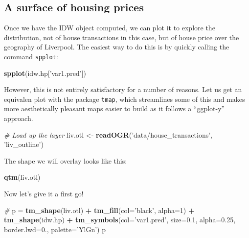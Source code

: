 \documentclass[
]{book}
\newenvironment{Shaded}{\begin{snugshade}}{\end{snugshade}}
\newcommand{\CommentTok}[1]{\textcolor[rgb]{0.56,0.35,0.01}{\textit{#1}}}
\newcommand{\DataTypeTok}[1]{\textcolor[rgb]{0.13,0.29,0.53}{#1}}
\newcommand{\DecValTok}[1]{\textcolor[rgb]{0.00,0.00,0.81}{#1}}
\newcommand{\FloatTok}[1]{\textcolor[rgb]{0.00,0.00,0.81}{#1}}
\newcommand{\KeywordTok}[1]{\textcolor[rgb]{0.13,0.29,0.53}{\textbf{#1}}}
\newcommand{\NormalTok}[1]{#1}
\newcommand{\OperatorTok}[1]{\textcolor[rgb]{0.81,0.36,0.00}{\textbf{#1}}}
\newcommand{\StringTok}[1]{\textcolor[rgb]{0.31,0.60,0.02}{#1}}
\begin{document}
\hypertarget{a-surface-of-housing-prices}{%
\subsection{A surface of housing prices}\label{a-surface-of-housing-prices}}

Once we have the IDW object computed, we can plot it to explore the distribution, not of house transactions in this case, but of house price over the geography of Liverpool. The easiest way to do this is by quickly calling the command \texttt{spplot}:

\begin{Shaded}
\begin{Highlighting}[]
\KeywordTok{spplot}\NormalTok{(idw.hp[}\StringTok{'var1.pred'}\NormalTok{])}
\end{Highlighting}
\end{Shaded}

However, this is not entirely satisfactory for a number of reasons. Let us get an equivalen plot with the package \texttt{tmap}, which streamlines some of this and makes more aesthetically pleasant maps easier to build as it follows a ``ggplot-y'' approach.

\begin{Shaded}
\begin{Highlighting}[]
\CommentTok{# Load up the layer}
\NormalTok{liv.otl <-}\StringTok{ }\KeywordTok{readOGR}\NormalTok{(}\StringTok{'data/house_transactions'}\NormalTok{, }\StringTok{'liv_outline'}\NormalTok{)}
\end{Highlighting}
\end{Shaded}

The shape we will overlay looks like this:

\begin{Shaded}
\begin{Highlighting}[]
\KeywordTok{qtm}\NormalTok{(liv.otl)}
\end{Highlighting}
\end{Shaded}

Now let's give it a first go!

\begin{Shaded}
\begin{Highlighting}[]
\CommentTok{# }
\NormalTok{p =}\StringTok{ }\KeywordTok{tm_shape}\NormalTok{(liv.otl) }\OperatorTok{+}\StringTok{ }\KeywordTok{tm_fill}\NormalTok{(}\DataTypeTok{col=}\StringTok{'black'}\NormalTok{, }\DataTypeTok{alpha=}\DecValTok{1}\NormalTok{) }\OperatorTok{+}
\StringTok{  }\KeywordTok{tm_shape}\NormalTok{(idw.hp) }\OperatorTok{+}\StringTok{ }
\StringTok{  }\KeywordTok{tm_symbols}\NormalTok{(}\DataTypeTok{col=}\StringTok{'var1.pred'}\NormalTok{, }\DataTypeTok{size=}\FloatTok{0.1}\NormalTok{, }\DataTypeTok{alpha=}\FloatTok{0.25}\NormalTok{, }
             \DataTypeTok{border.lwd=}\FloatTok{0.}\NormalTok{, }\DataTypeTok{palette=}\StringTok{'YlGn'}\NormalTok{)}
\NormalTok{p}
\end{Highlighting}
\end{Shaded}
\end{document}
